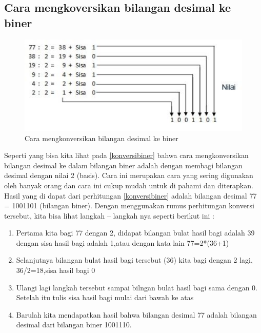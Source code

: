 {\subsection{Cara mengkoversikan bilangan desimal ke biner}
\begin{figure}[ht]
\centerline{\includegraphics[width=1\textwidth]{figures/konversibiner.JPG}}
\caption{Cara mengkonversikan bilangan desimal ke biner}
\label{Contoh Konversi Bilangan Desimal}
\end{figure}
Seperti yang bisa kita lihat pada \ref{konversibiner} bahwa cara mengkonversikan bilangan desimal ke dalam bilangan biner adalah dengan membagi bilangan desimal dengan nilai 2 (basis). Cara ini merupakan cara yang sering digunakan oleh banyak orang dan cara ini cukup mudah untuk di pahami dan diterapkan. Hasil yang di dapat dari perhitungan \ref{konversibiner} adalah bilangan desimal 77 = 1001101 (bilangan biner). Dengan menggunakan rumus perhitungan konversi tersebut, kita bisa lihat langkah – langkah nya seperti berikut ini : 
\begin{enumerate}
	\item Pertama kita bagi 77 dengan 2, didapat bilangan bulat hasil bagi adalah 39 dengan sisa hasil bagi adalah 1,atau dengan kata lain 77=2*(36+1)
	\item Selanjutnya bilangan bulat hasil bagi tersebut (36) kita bagi dengan 2 lagi, 36/2=18,sisa hasil bagi 0
	\item Ulangi lagi langkah tersebut sampai bilngan bulat hasil bagi sama dengan 0. Setelah itu tulis sisa hasil bagi mulai dari bawah ke atas
	\item Barulah kita mendapatkan hasil bahwa bilangan desimal 77 adalah bilangan desimal dari bilangan biner 1001110.
\end{enumerate}


}
